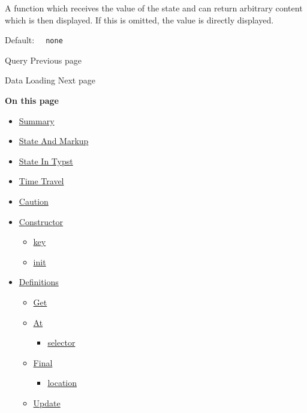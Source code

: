 A function which receives the value of the state and can return
arbitrary content which is then displayed. If this is omitted, the value
is directly displayed.

Default: \texttt{\ }{\texttt{\ none\ }}\texttt{\ }

\href{/docs/reference/introspection/query/}{\pandocbounded{}}

{ Query } { Previous page }

\href{/docs/reference/data-loading/}{\pandocbounded{}}

{ Data Loading } { Next page }

\textbf{On this page}

\begin{itemize}
\tightlist
\item
  \hyperref[summary]{Summary}
\item
  \hyperref[state-and-markup]{State And Markup}
\item
  \hyperref[state-in-typst]{State In Typst}
\item
  \hyperref[time-travel]{Time Travel}
\item
  \hyperref[caution]{Caution}
\item
  \hyperref[constructor]{Constructor}

  \begin{itemize}
  \tightlist
  \item
    \hyperref[constructor-key]{key}
  \item
    \hyperref[constructor-init]{init}
  \end{itemize}
\item
  \hyperref[definitions]{Definitions}

  \begin{itemize}
  \tightlist
  \item
    \hyperref[definitions-get]{Get}
  \item
    \hyperref[definitions-at]{At}

    \begin{itemize}
    \tightlist
    \item
      \hyperref[definitions-at-selector]{selector}
    \end{itemize}
  \item
    \hyperref[definitions-final]{Final}

    \begin{itemize}
    \tightlist
    \item
      \hyperref[definitions-final-location]{location}
    \end{itemize}
  \item
    \hyperref[definitions-update]{Update}


\end{itemize}
\end{itemize}
